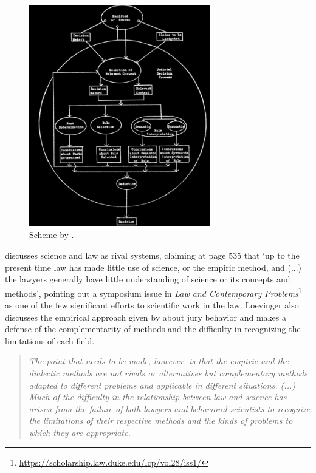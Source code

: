 \documentclass[a4paper]{exam}
\theoremstyle{plain}
\begin{document}
\begin{figure}[!h]
  \begin{center}
    \includegraphics[width=0.7\textwidth]{allen.png}
  \caption{Scheme by \cite[p. 227]{allen1963modern}.}
  \label{fig:allen}
  \end{center}
\end{figure}


\cite{loevinger1966law} discusses science and law as rival systems, claiming at page 535 that `up to the present time law has made little use of science, or the empiric method, and (...) the lawyers generally have little understanding of science or its concepts and methods', pointing out a symposium issue in \textit{Law and Contemporary Problems}\footnote{\url{https://scholarship.law.duke.edu/lcp/vol28/iss1/}} as one of the few significant efforts to scientific work in the law. Loevinger also discusses the empirical approach given by \cite{kalven1966american} about jury behavior and makes a defense of the complementarity of methods and the difficulty in recognizing the limitations of each field.
\begin{quote}
\textit{The point that needs to be made, however, is that the empiric and the dialectic methods are not rivals or alternatives but complementary methods adapted to different problems and applicable in different situations. (...) Much of the difficulty in the relationship between law and science has arisen from the failure of both lawyers and behavioral scientists to recognize the limitations of their respective methods and the kinds of problems to which they are appropriate.} \cite[pp. 541-543]{loevinger1966law}
\end{quote}
\end{document}
